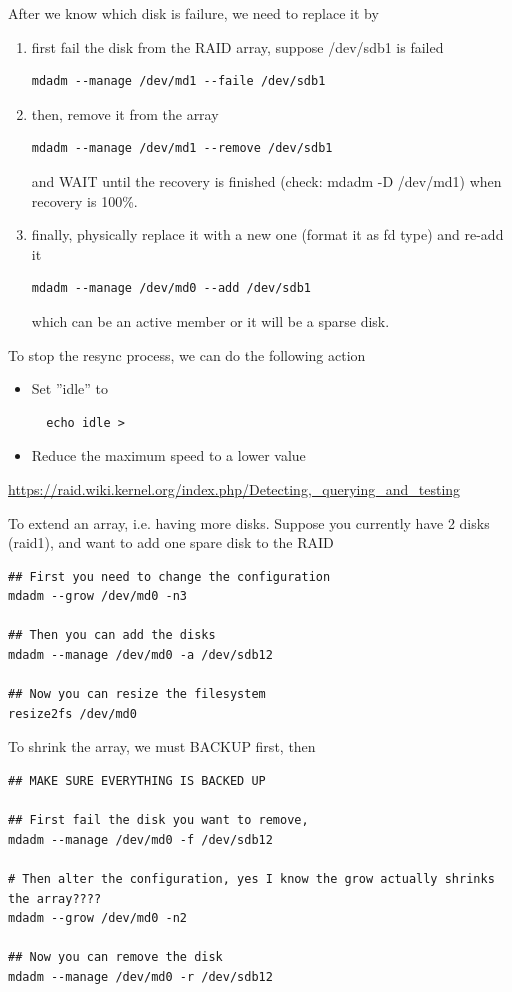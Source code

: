 After we know which disk is failure, we need to replace it by 
\begin{enumerate}
  \item first fail the disk from the RAID array, suppose /dev/sdb1 is failed
\begin{verbatim}
mdadm --manage /dev/md1 --faile /dev/sdb1
\end{verbatim}

\item then, remove it from the array
\begin{verbatim}
mdadm --manage /dev/md1 --remove /dev/sdb1
\end{verbatim}
and WAIT until the recovery is finished (check: mdadm -D /dev/md1) when recovery
is 100\%. 

\item finally, physically replace it with a new one (format it as fd type) and
re-add it
\begin{verbatim}
mdadm --manage /dev/md0 --add /dev/sdb1
\end{verbatim}
which can be an active member or it will be a sparse disk.
\end{enumerate}


To stop the resync process, we can do the following action
\begin{itemize}
  \item Set ''idle'' to 
  \begin{verbatim}
  echo idle > 
  \end{verbatim}
  \item Reduce the maximum speed to a lower value
  
\end{itemize}
\url{https://raid.wiki.kernel.org/index.php/Detecting,_querying_and_testing}


To extend an array, i.e. having more disks. Suppose you currently have 2 disks
(raid1), and want to add one spare disk to the RAID
\begin{verbatim}
## First you need to change the configuration 
mdadm --grow /dev/md0 -n3

## Then you can add the disks 
mdadm --manage /dev/md0 -a /dev/sdb12 

## Now you can resize the filesystem
resize2fs /dev/md0
\end{verbatim}


To shrink the array, we must BACKUP first, then
\begin{verbatim}
## MAKE SURE EVERYTHING IS BACKED UP

## First fail the disk you want to remove,
mdadm --manage /dev/md0 -f /dev/sdb12

# Then alter the configuration, yes I know the grow actually shrinks the array????
mdadm --grow /dev/md0 -n2

## Now you can remove the disk 
mdadm --manage /dev/md0 -r /dev/sdb12
\end{verbatim}


